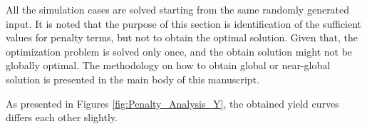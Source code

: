 \documentclass[a4paper,fleqn]{cas-dc}
\begin{document}
All the simulation cases are solved starting from the same randomly generated input. It is noted that the purpose of this section is identification of the sufficient values for penalty terms, but not to obtain the optimal solution. Given that, the optimization problem is solved only once, and the obtain solution might not be globally optimal. The methodology on how to obtain global or near-global solution is presented in the main body of this manuscript.

As presented in Figures \ref{fig:Penalty_Analysis_Y}, the obtained yield curves differs each other slightly.
\end{document}
